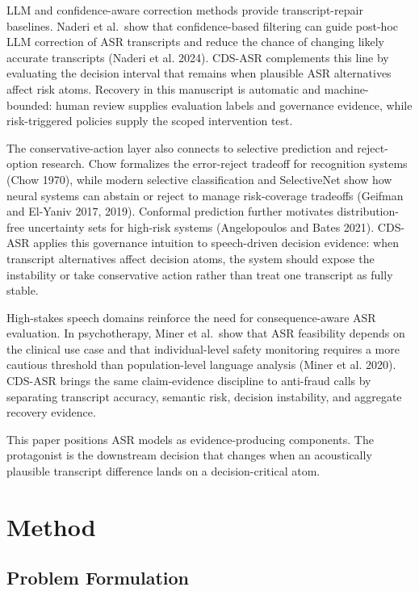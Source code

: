 \documentclass[
]{article}
\begin{document}
LLM and confidence-aware correction methods provide transcript-repair
baselines. Naderi et al.~show that confidence-based filtering can guide
post-hoc LLM correction of ASR transcripts and reduce the chance of
changing likely accurate transcripts (Naderi et al. 2024). CDS-ASR
complements this line by evaluating the decision interval that remains
when plausible ASR alternatives affect risk atoms. Recovery in this
manuscript is automatic and machine-bounded: human review supplies
evaluation labels and governance evidence, while risk-triggered policies
supply the scoped intervention test.

The conservative-action layer also connects to selective prediction and
reject-option research. Chow formalizes the error-reject tradeoff for
recognition systems (Chow 1970), while modern selective classification
and SelectiveNet show how neural systems can abstain or reject to manage
risk-coverage tradeoffs (Geifman and El-Yaniv 2017, 2019). Conformal
prediction further motivates distribution-free uncertainty sets for
high-risk systems (Angelopoulos and Bates 2021). CDS-ASR applies this
governance intuition to speech-driven decision evidence: when transcript
alternatives affect decision atoms, the system should expose the
instability or take conservative action rather than treat one transcript
as fully stable.

High-stakes speech domains reinforce the need for consequence-aware ASR
evaluation. In psychotherapy, Miner et al.~show that ASR feasibility
depends on the clinical use case and that individual-level safety
monitoring requires a more cautious threshold than population-level
language analysis (Miner et al. 2020). CDS-ASR brings the same
claim-evidence discipline to anti-fraud calls by separating transcript
accuracy, semantic risk, decision instability, and aggregate recovery
evidence.

This paper positions ASR models as evidence-producing components. The
protagonist is the downstream decision that changes when an acoustically
plausible transcript difference lands on a decision-critical atom.

\hypertarget{method}{%
\section{Method}\label{method}}

\hypertarget{problem-formulation}{%
\subsection{Problem Formulation}\label{problem-formulation}}
\end{document}
